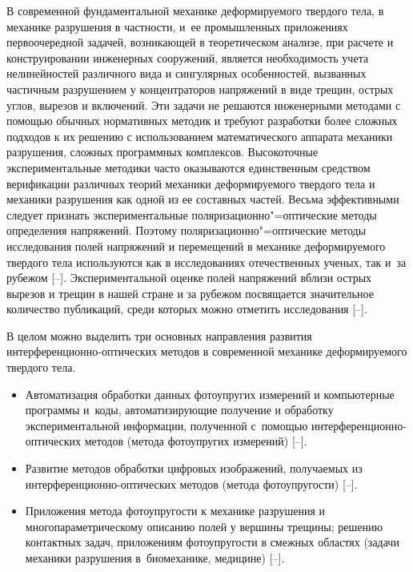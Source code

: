 \date{}

\renewcommand{\JournalDataOnline}{\displaydate{stepanovae}}

\vspace{5mm}

\makerutitle


В современной фундаментальной механике деформируемого твердого тела, в механике разрушения в частности, и~ее промышленных приложениях первоочередной задачей, возникающей в теоретическом анализе, при расчете и конструировании инженерных сооружений, является необходимость учета нелинейностей различного вида и сингулярных особенностей, вызванных частичным разрушением у концентраторов напряжений в виде трещин, острых углов, вырезов и включений. Эти задачи не решаются инженерными методами с помощью обычных нормативных методик и требуют разработки более сложных подходов к их решению с использованием математического аппарата механики разрушения, сложных программных комплексов. Высокоточные экспериментальные методики часто оказываются единственным средством верификации различных теорий механики деформируемого твердого тела и механики разрушения как одной из ее составных частей. Весьма эффективными следует признать экспериментальные поляризационно"=оптические методы определения напряжений. 
Поэтому поляризационно"=оптические методы исследования полей напряжений и перемещений в механике деформируемого твердого тела используются как в исследованиях отечественных ученых, так и~за рубежом [--].   
Экспериментальной оценке полей напряжений вблизи острых вырезов и трещин в нашей стране и за рубежом посвящается значительное количество публикаций, среди которых можно отметить исследования [--].

В целом можно выделить три основных направления развития ин\-тер\-фе\-рен\-ци\-он\-но-оп\-ти\-чес\-ких методов в современной механике деформируемого твердого тела.
\begin{itemize}
\item[1.] Автоматизация обработки данных фотоупругих измерений и компьютерные программы и~коды, автоматизирующие получение и обработку экспериментальной информации, полученной с~помощью ин\-тер\-фе\-рен\-ци\-он\-но-оптических методов (метода фотоупругих измерений) [--].
\item[2.]
Развитие методов обработки цифровых изображений, получаемых из интерференционно-оптических методов (метода фотоупругости) [--].
\item[3.] Приложения метода фотоупругости к механике разрушения и многопараметрическому описанию полей у вершины трещины; решению контактных задач, приложениям фотоупругости в смежных областях (задачи механики разрушения в~биомеханике, медицине) [--].

\end{itemize}


